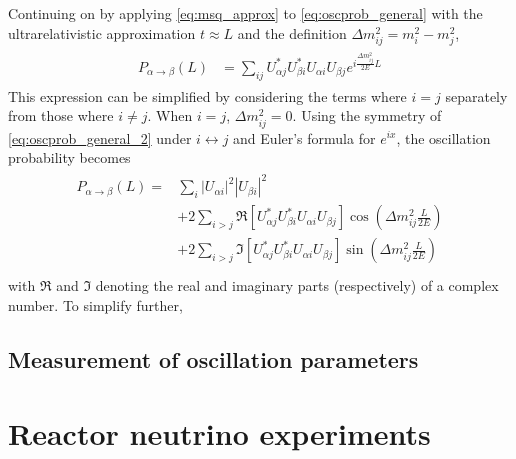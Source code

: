 Continuing on by applying \cref{eq:msq_approx} to \cref{eq:oscprob_general}
with the ultrarelativistic approximation $t \approx L$
and the definition $\Delta m^2_{ij} = m_i^2 - m_j^2$,
\begin{align}\label{eq:oscprob_general_2}
    \begin{split}
        P_{\alpha\to\beta}(L)
        &= \sum_{ij} U^*_{\alpha j} U^*_{\beta i} U_{\alpha i} U_{\beta j}
        e^{i\frac{\Delta m^2_{ij}}{2E}L}
    \end{split}
\end{align}
This expression can be simplified by considering the terms where $i=j$
separately from those where $i\neq j$.
When $i=j$, $\Delta m^2_{ij} = 0$.
Using the symmetry of \cref{eq:oscprob_general_2} under $i\leftrightarrow j$
and Euler's formula for $e^{ix}$,
the oscillation probability becomes
\begin{align}\label{eq:oscprob_general_3}
    \begin{split}
        P_{\alpha\to\beta}(L) =
        & \sum_i \left|U_{\alpha i}\right|^2 \left|U_{\beta i}\right|^2 \\
        & + 2\sum_{i>j} \Re \left[
            U^*_{\alpha j} U^*_{\beta i} U_{\alpha i} U_{\beta j}
        \right]
        \cos\left(\Delta m^2_{ij}\frac{L}{2E}\right) \\
        & + 2\sum_{i>j} \Im \left[
            U^*_{\alpha j} U^*_{\beta i} U_{\alpha i} U_{\beta j}
        \right]
        \sin\left(\Delta m^2_{ij}\frac{L}{2E}\right) \\
    \end{split}
\end{align}
with $\Re$ and $\Im$ denoting the real and imaginary parts (respectively)
of a complex number.
To simplify further, 


\subsection{Measurement of oscillation parameters}
\label{subsec:osc_param_exp}

\section{Reactor neutrino experiments}
\label{sec:experiment_intro}

